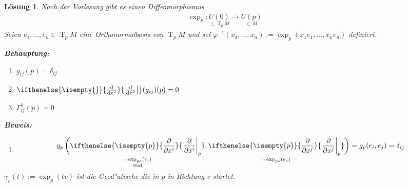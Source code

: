 \documentclass[paper=A4, twoside, chapterprefix=true, bibliography=totoc, headsepline]{scrbook}
\let\temp\phi
\let\phi\varphi
\let\varphi\temp
\let\temp\theta
\let\theta\vartheta
\let\vartheta\temp
\let\temp\epsilon
\let\epsilon\varepsilon
\let\varepsilon\temp
\let\temp\rho
\let\rho\varrho
\let\varrho\temp
\DeclareMathOperator{\id}{id} %
\DeclareMathOperator{\T}{T} %
\newcommand{\dop}{\mathrm{d}}
\newcommand{\difffrac}[3][]{\ifthenelse{\isempty{#1}}{\frac{\dop #2}{\dop #3}}{\left. \frac{\dop #2}{\dop #3} \right|_{#1}}}
\newcommand{\pdifffrac}[3][]{\ifthenelse{\isempty{#1}}{\frac{\partial #2}{\partial #3}}{\left. \frac{\partial #2}{\partial #3} \right|_{#1}}}
\theoremstyle{plain}
\theoremstyle{nonumberplain}
\theoremstyle{empty}
\theoremstyle{break}
\newtheorem{Loes}{L\"osung}
\begin{document}
\begin{Loes}
Nach der Vorlesung gibt es einen Diffeomorphismus
\begin{align*}
	\exp_p: \underset{\subset \T_pM}{U(0)} \to \underset{\subset M}{U(p)}
\end{align*}
Seien $e_1,\ldots , e_n \in \T_pM$ eine Orthonormalbasis von $\T_pM$ und sei $\phi^{-1}(x_1,\ldots ,x_n) := \exp_p(x_1e_1,\ldots ,x_ne_n)$ definiert.

\textbf{Behauptung:}\begin{enumerate}[label=(\roman*)]
\item
	$g_{ij}(p) = \delta_{ij}$
\item
	$\difffrac{}{x^2}(g_{ij})(p) = 0$
\item
	$\Gamma_{ij}^k(p) = 0$
\end{enumerate}
\textbf{Beweis:}\begin{enumerate}[label=(\roman*),leftmargin=*,widest=iii]
\item
	\begin{align*}
		g_p \left( \smash{ \underset{\substack{=\exp_{p*}(e_i) \\ \equiv \id}}{\pdifffrac[p]{}{x^{i}}}, \underset{= \exp_{p*}(e_j)}{\pdifffrac[p]{}{x^{j}}} } \vphantom{\pdifffrac{}{}} \right) = g_p(e_i, e_j) = \delta_{ij} \vphantom{\underset{\substack{a\\a}}{\pdifffrac{}{}}}
	\end{align*}
\end{enumerate}
$\gamma_v(t) := \exp_p(tv)$ ist die Geod"atische die in $p$ in Richtung $v$ startet.


\end{Loes}
\end{document}
